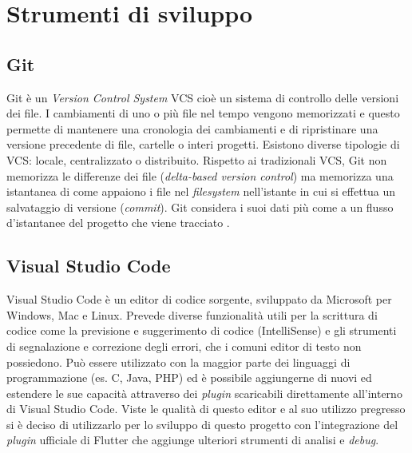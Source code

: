 %
\section{Strumenti di sviluppo}
\subsection{Git}
Git è un \textit{Version Control System} VCS cioè un sistema di controllo delle versioni dei file. I cambiamenti di uno o più file nel tempo vengono memorizzati e questo permette di mantenere una cronologia dei cambiamenti e di ripristinare una versione precedente di file, cartelle o interi progetti. Esistono diverse tipologie di VCS: locale, centralizzato o distribuito.
Rispetto ai tradizionali VCS, Git non memorizza le differenze dei file (\textit{delta-based version control}) ma memorizza una istantanea di come appaiono i file nel \textit{filesystem} nell'istante in cui si effettua un salvataggio di versione (\textit{commit}). Git considera i suoi dati più come a un flusso d'istantanee del progetto che viene tracciato \cite{gitSite}.
%
\subsection{Visual Studio Code}
Visual Studio Code è un editor di codice sorgente, sviluppato da Microsoft per Windows, Mac e Linux. Prevede diverse funzionalità utili per la scrittura di codice come la previsione e suggerimento di codice (IntelliSense) e gli strumenti di segnalazione e correzione degli errori, che i comuni editor di testo non possiedono.
Può essere utilizzato con la maggior parte dei linguaggi di programmazione (es. C, Java, PHP) ed è possibile aggiungerne di nuovi ed estendere le sue capacità attraverso dei \textit{plugin} scaricabili direttamente all'interno di Visual Studio Code.
Viste le qualità di questo editor e al suo utilizzo pregresso si è deciso di utilizzarlo per lo sviluppo di questo progetto con l'integrazione del \textit{plugin} ufficiale di Flutter che aggiunge ulteriori strumenti di analisi e \textit{debug}.